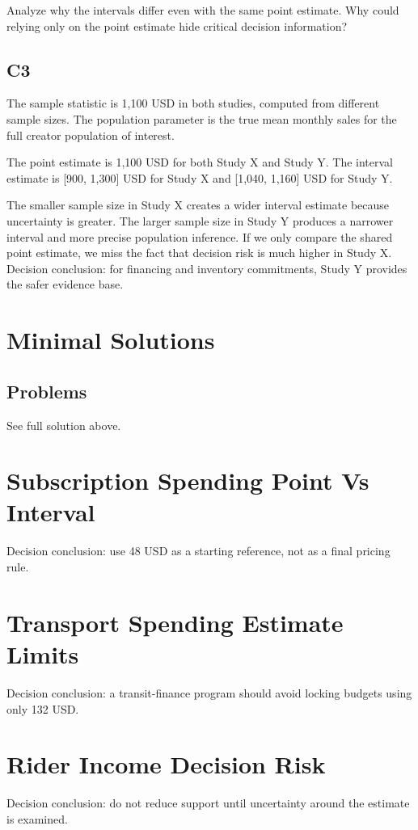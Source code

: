 \begin{ExamProblems}
		Analyze why the intervals differ even with the same point estimate.
		Why could relying only on the point estimate hide critical decision information?

		\subsection*{C3}
		The sample statistic is 1,100 USD in both studies, computed from different sample sizes.
		The population parameter is the true mean monthly sales for the full creator population of interest.

		The point estimate is 1,100 USD for both Study X and Study Y.
		The interval estimate is [900, 1,300] USD for Study X and [1,040, 1,160] USD for Study Y.

		The smaller sample size in Study X creates a wider interval estimate because uncertainty is greater.
		The larger sample size in Study Y produces a narrower interval and more precise population inference.
		If we only compare the shared point estimate, we miss the fact that decision risk is much higher in Study X.
		Decision conclusion: for financing and inventory commitments, Study Y provides the safer evidence base.

	\end{ExamProblems}


\section{Minimal Solutions}

\subsection*{Problems}
See full solution above.

\section{Subscription Spending Point Vs Interval}
Decision conclusion: use 48 USD as a starting reference, not as a final pricing rule.

\section{Transport Spending Estimate Limits}
Decision conclusion: a transit-finance program should avoid locking budgets using only 132 USD.

\section{Rider Income Decision Risk}
Decision conclusion: do not reduce support until uncertainty around the estimate is examined.

